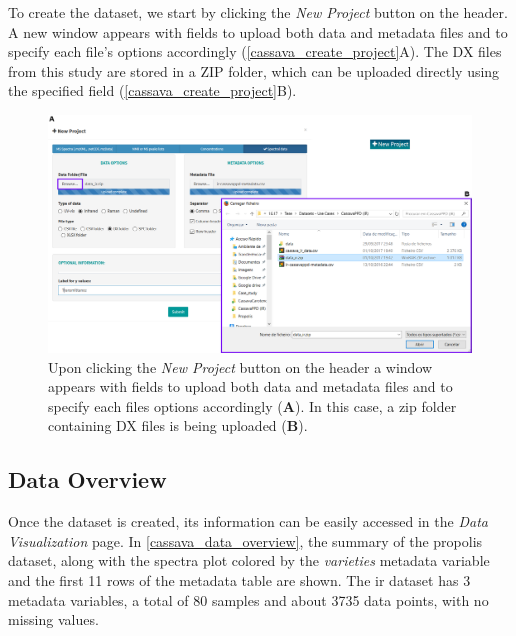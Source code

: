 To create the dataset, we start by clicking the \textit{New Project} button on the header. A new window appears with fields to upload both data and metadata files and to specify each file's options accordingly (\autoref{cassava_create_project}A). The DX files from this study are stored in a ZIP folder, which can be uploaded directly using the specified field (\autoref{cassava_create_project}B).

\begin{figure}[h]
	\centering
	\includegraphics[width=1\linewidth]{Imagens/CassavaPPD/data_load}
	\caption{Upon clicking the \textit{New Project} button on the header a window appears with fields to upload both data and metadata files and to specify each files options accordingly (\textbf{A}). In this case, a zip folder containing DX files is being uploaded (\textbf{B}).}
	\label{cassava_create_project}
\end{figure}


\subsection{Data Overview}

Once the dataset is created, its information can be easily accessed in the \textit{Data Visualization} page. In \autoref{cassava_data_overview}, the summary of the propolis dataset, along with the spectra plot colored by the \textit{varieties} metadata variable and the first 11 rows of the metadata table are shown. The \gls{ir} dataset has 3 metadata variables, a total of 80 samples and about 3735 data points, with no missing values.

